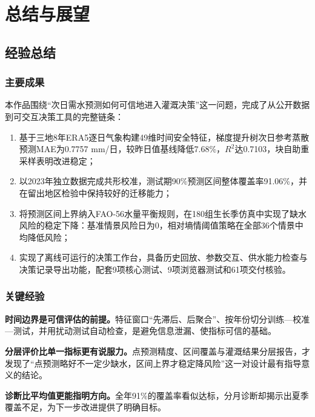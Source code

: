 \section{总结与展望}\label{sec:outlook}
\subsection{经验总结}
\subsubsection{主要成果}
本作品围绕“次日需水预测如何可信地进入灌溉决策”这一问题，完成了从公开数据到可交互决策工具的完整链条：
\begin{enumerate}
\item 基于三地8年ERA5逐日气象构建49维时间安全特征，梯度提升树次日参考蒸散预测MAE为0.7757 mm/日，较昨日值基线降低7.68\%，$R^2$达0.7103，块自助重采样表明改进稳定；
\item 以2023年独立数据完成共形校准，测试期90\%预测区间整体覆盖率91.06\%，并在留出地区检验中保持较好的迁移能力；
\item 将预测区间上界纳入FAO-56水量平衡规则，在180组生长季仿真中实现了缺水风险的稳定下降：基准情景风险日为0，相对墒情阈值策略在全部36个情景中均降低风险；
\item 实现了离线可运行的决策工作台，具备历史回放、参数交互、供水能力检查与决策记录导出功能，配套9项核心测试、9项浏览器测试和61项交付核验。
\end{enumerate}

\subsubsection{关键经验}
\textbf{时间边界是可信评估的前提。}特征窗口“先滞后、后聚合”、按年份切分训练—校准—测试，并用扰动测试自动检查，是避免信息泄漏、使指标可信的基础。

\textbf{分层评价比单一指标更有说服力。}点预测精度、区间覆盖与灌溉结果分层报告，才发现了“点预测略好不一定少缺水，区间上界才稳定降风险”这一对设计最有指导意义的结论。

\textbf{诊断比平均值更能指明方向。}全年91\%的覆盖率看似达标，分月诊断却揭示出夏季覆盖不足，为下一步改进提供了明确目标。

